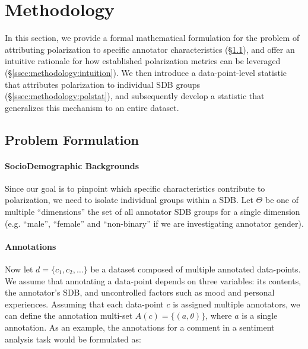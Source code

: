 \documentclass[twocolumn, 8pt]{article}
\begin{document}


\section{Methodology}
\label{sec:methodology}

In this section, we provide a formal mathematical formulation for the problem of attributing polarization to specific annotator characteristics (\S\ref{ssec:methodology:problem}), and offer an intuitive rationale for how established polarization metrics can be leveraged (\S\ref{ssec:methodology:intuition}). We then introduce a data-point-level statistic that attributes polarization to individual \ac{SDB} groups (\S\ref{ssec:methodology:polstat}), and subsequently develop a statistic that generalizes this mechanism to an entire dataset.


\subsection{Problem Formulation}
\label{ssec:methodology:problem}

\paragraph{SocioDemographic Backgrounds }Since our goal is to pinpoint which specific characteristics contribute to polarization, we need to isolate individual groups within a \ac{SDB}. Let $\Theta$ be one of multiple ``dimensions'' the set of all annotator \ac{SDB} groups for a single dimension (e.g. ``male'', ``female'' and ``non-binary'' if we are investigating annotator gender).

\paragraph{Annotations} Now let $d = \{c_1, c_2, \ldots\}$ be a dataset composed of multiple annotated data-points. We assume that annotating a data-point depends on three variables: its contents, the annotator's \ac{SDB}, and uncontrolled factors such as mood and personal experiences. Assuming that each data-point $c$ is assigned multiple annotators, we can define the annotation multi-set $A(c)=  \{(a, \theta) \}$, where $a$ is a single annotation. As an example, the annotations for a comment in a sentiment analysis task would be formulated as:
\end{document}

